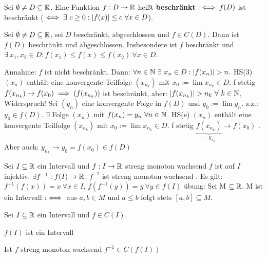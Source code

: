 \documentclass[a4paper,oneside,DIV15,BCOR12mm]{scrbook}
\begin{document}
\begin{definition*}
Sei $\emptyset \ne D \subseteq \mathbb{R}$. Eine Funktion $f: D\to\mathbb{R}$ heißt \textbf{beschränkt} $:\iff f(D)$ ist beschränkt ($\iff \exists\ c \ge 0 : |f(x)| \le c\ \forall x \in D$).
\end{definition*}

\begin{satz}
Sei $\emptyset \ne D \subseteq \mathbb{R}$, sei $D$ beschränkt, abgeschlossen und $f \in C(D)$. Dann ist $f(D)$ beschränkt und abgeschlossen. Insbesondere ist $f$ beschränkt und $\exists\ x_1, x_2 \in D : f(x_1) \le f(x) \le f(x_2)\ \forall x \in D$.
\end{satz}

\begin{beweis}
Annahme: $f$ ist nicht beschränkt. Dann: $\forall n \in \mathbb{N}\ \exists\ x_n \in D: |f(x_n)| > n.$ HS(3) \folgt $(x_n)$ enthält eine konvergente Teilfolge $(x_{n_k})$ mit $x_0:=\lim x_{n_k} \in D$. f stetig \folgt $f(x_{n_k}) \to f(x_0) \implies (f(x_{n_k}))$ ist beschränkt, aber: $|f(x_{n_k})| > n_k\ \forall\ k \in \mathbb{N}$, Widerspruch! Sei $(y_n)$ eine konvergente Folge in $f(D)$ und $y_0:=\lim y_n$. z.z.: $y_0 \in f(D)$. $\exists$ Folge $(x_n)$ mit $f(x_n)=y_n\ \forall n \in \mathbb{N}$. HS(e) \folgt $(x_n)$ enthält eine konvergente Teilfolge $(x_{n_k})$ mit $x_0:=\lim x_{n_k} \in D$. f stetig \folgt $\underbrace{f(x_{n_k})}_{=y_{n_k}} \to f(x_0)$ . Aber auch: $y_{n_k} \to y_0 = f(x_0) \in f(D)$
\end{beweis}

Sei $I \subseteq \mathbb{R}$ ein Intervall und $f: I \to \mathbb{R}$ streng monoton wachsend  \folgt $f$ ist auf $I$ injektiv. \folgt $\exists f^{-1}: f(I) \to \mathbb{R}$. $f^{-1}$ ist streng monoton wachsend . Es gilt: $f^{-1}(f(x)) = x\ \forall x \in I$, $f(f^{-1}(y)) = y\ \forall y \in f(I)$ übung: Sei M $\subseteq \mathbb{R}$. M ist ein Intervall $:\iff$ aus $a, b \in M$ und $a \le b$ folgt stets $[a, b] \subseteq M$.

\begin{satz}
Sei $I \subseteq \mathbb{R}$ ein Intervall und $f \in C(I)$.
\begin{liste}
\item $f(I)$ ist ein Intervall
\item Ist $f$ streng monoton wachsend  \folgt $f^{-1} \in C(f(I))$
\end{liste}
\end{satz}
\end{document}
